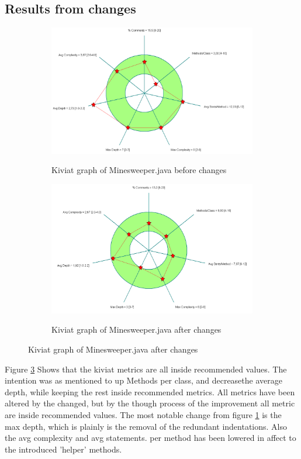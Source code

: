 \documentclass[UKenglish]{article}  %
\begin{document}
\subsection{Results from changes}
\begin{figure}[h]
	\begin{subfigure}[b]{0.5\textwidth}
		\caption{Kiviat graph of Minesweeper.java before changes}
		\includegraphics[width=\textwidth]{kiviat_minesweeper_before}
		\label{minesweeper_before}
	\end{subfigure}
	\begin{subfigure}[b]{0.5\textwidth}
		\caption{Kiviat graph of Minesweeper.java after changes}
		\includegraphics[width=\textwidth]{kiviat_minesweeper_after}
		\label{minesweeper_after}
	\end{subfigure}
\end{figure}

Figure \ref{minesweeper_after} Shows that the kiviat metrics are all inside
recommended values. The intention was as mentioned to up Methods per class, and
decreasethe average depth, while keeping the rest inside recommended metrics.
All metrics have been altered by the changed, but by the though process of the
improvement all metric are inside recommended values. The most notable change
from figure \ref{minesweeper_before} is the max depth, which is plainly is the
removal of the redundant indentations. Also the avg complexity and avg
statements. per method has been lowered in affect to the introduced 'helper'
methods.
\end{document}
